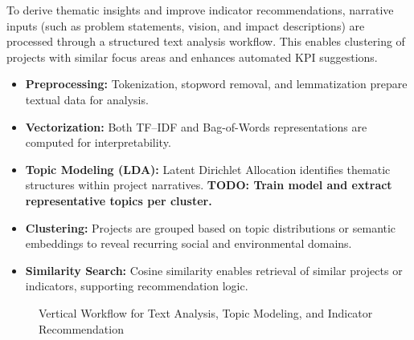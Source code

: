 To derive thematic insights and improve indicator recommendations, narrative inputs (such as problem statements, vision, and impact descriptions) are processed through a structured text analysis workflow.
This enables clustering of projects with similar focus areas and enhances automated KPI suggestions.

\begin{itemize}
    \item \textbf{Preprocessing:} Tokenization, stopword removal, and lemmatization prepare textual data for analysis.
    \item \textbf{Vectorization:} Both TF–IDF and Bag-of-Words representations are computed for interpretability.
    \item \textbf{Topic Modeling (LDA):} Latent Dirichlet Allocation identifies thematic structures within project narratives. \textbf{TODO: Train model and extract representative topics per cluster.}
    \item \textbf{Clustering:} Projects are grouped based on topic distributions or semantic embeddings to reveal recurring social and environmental domains.
    \item \textbf{Similarity Search:} Cosine similarity enables retrieval of similar projects or indicators, supporting recommendation logic.
\end{itemize}

\begin{figure}[H]
\centering
{}
\caption{Vertical Workflow for Text Analysis, Topic Modeling, and Indicator Recommendation}
\label{fig:text-analysis-pipeline}
\end{figure}

